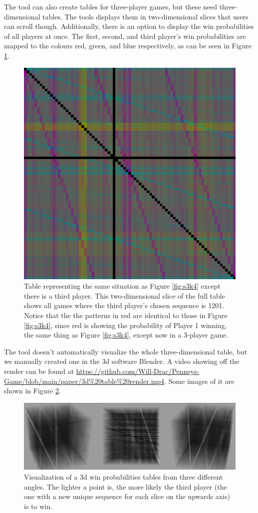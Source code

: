 \documentclass[english,12pt,a4paper,final]{article}
\begin{document}
The tool can also create tables for three-player games, but these need three-dimensional tables. The tools displays them in two-dimensional slices that users can scroll though. Additionally, there is an option to display the win probabilities of all players at once. The first, second, and third player's win probabilities are mapped to the colours red, green, and blue respectively, as can be seen in Figure \ref{fig:s3k4-3p}.

\begin{figure} [H]
	\centering
	\includegraphics[width=0.7\linewidth]{"s3k4 3p"}
	\caption{Table representing the same situation as Figure \ref{fig:s3k4} except there is a third player. This two-dimensional slice of the full table shows all games where the third player's chosen sequence is 1201. Notice that the the patterns in red are identical to those in Figure \ref{fig:s3k4}, since red is showing the probability of Player 1 winning, the same thing as Figure \ref{fig:s3k4}, except now in a 3-player game.}
	\label{fig:s3k4-3p}
\end{figure}

The tool doesn't automatically visualize the whole three-dimensional table, but we manually created one in the 3d software Blender. A video showing off the render can be found at \href{https://github.com/Will-Drac/Penneys-Game/blob/main/paper/3d%20table%20render.mp4}{https://github.com/Will-Drac/Penneys-Game/blob/main/paper/3d\%20table\%20render.mp4}. Some images of it are shown in Figure \ref{fig:3d}.

\begin{figure} [H]
	\centering
	\includegraphics[width=0.9\linewidth]{3d}
	\caption{Visualization of a 3d win probabilities tables from three different angles. The lighter a point is, the more likely the third player (the one with a new unique sequence for each slice on the upwards axis) is to win.}
	\label{fig:3d}
\end{figure}
\end{document}
